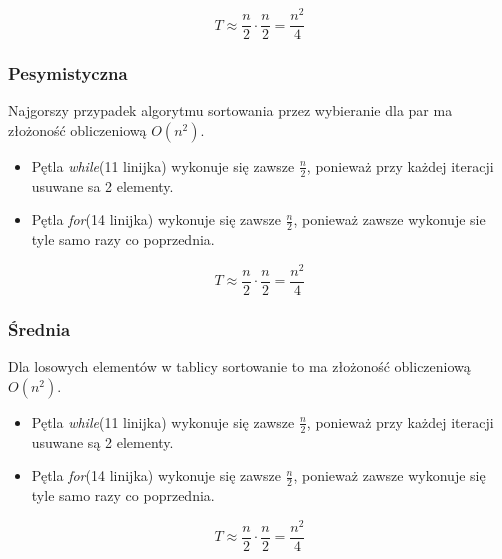 \begin{equation*}
T \approx \frac{n}{2} \cdot \frac{n}{2} = \frac{n^2}{4}
\end{equation*}
\wyjT
\subsubsection*{Pesymistyczna}
Najgorszy przypadek algorytmu sortowania przez wybieranie dla par ma złożoność obliczeniową $O(n^2)$.
\begin{itemize}
\item Pętla \textit{while}(11 linijka) wykonuje się zawsze $\frac{n}{2}$, ponieważ przy każdej iteracji usuwane sa 2 elementy.
\item Pętla \textit{for}(14 linijka) wykonuje się zawsze $\frac{n}{2}$, ponieważ zawsze wykonuje sie tyle samo razy co poprzednia.
\end{itemize}
\begin{equation*}
T \approx \frac{n}{2} \cdot \frac{n}{2} = \frac{n^2}{4}
\end{equation*}
\wyjT
\subsubsection*{Średnia}
Dla losowych elementów w tablicy sortowanie to ma złożoność obliczeniową $O(n^2)$.
\begin{itemize}
\item Pętla \textit{while}(11 linijka) wykonuje się zawsze $\frac{n}{2}$, ponieważ przy każdej iteracji usuwane są 2 elementy.
\item Pętla \textit{for}(14 linijka) wykonuje się zawsze $\frac{n}{2}$, ponieważ zawsze wykonuje się tyle samo razy co poprzednia.
\end{itemize}

\begin{equation*}
T \approx \frac{n}{2} \cdot \frac{n}{2} = \frac{n^2}{4}
\end{equation*}
\wyjT
